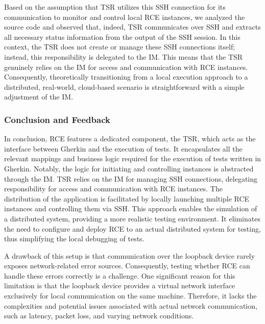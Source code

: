 Based on the assumption that \ac{TSR} utilizes this \ac{SSH} connection for its communication to monitor and control local \ac{RCE} instances, we analyzed the source code and observed that, indeed, \ac{TSR} communicates over \ac{SSH} and extracts all necessary status information from the output of the \ac{SSH} session. In this context, the \ac{TSR} does not create or manage these \ac{SSH} connections itself; instead, this responsibility is delegated to the \ac{IM}. This means that the \ac{TSR} genuinely relies on the \ac{IM} for access and communication with \ac{RCE} instances. Consequently, theoretically transitioning from a local execution approach to a distributed, real-world, cloud-based scenario is straightforward with a simple adjustment of the \ac{IM}.

\subsubsection{Conclusion and Feedback}
In conclusion, RCE features a dedicated component, the \acf{TSR}, which acts as the interface between Gherkin and the execution of tests. It encapsulates all the relevant mappings and business logic required for the execution of tests written in Gherkin. Notably, the logic for initiating and controlling instances is abstracted through the \acf{IM}. \ac{TSR} relies on the \ac{IM} for managing \ac{SSH} connections, delegating responsibility for access and communication with RCE instances. The distribution of the application is facilitated by locally launching multiple RCE instances and controlling them via \ac{SSH}. This approach enables the simulation of a distributed system, providing a more realistic testing environment. It eliminates the need to configure and deploy RCE to an actual distributed system for testing, thus simplifying the local debugging of tests.

A drawback of this setup is that communication over the loopback device rarely exposes network-related error sources. Consequently, testing whether RCE can handle these errors correctly is a challenge. One significant reason for this limitation is that the loopback device provides a virtual network interface exclusively for local communication on the same machine. Therefore, it lacks the complexities and potential issues associated with actual network communication, such as latency, packet loss, and varying network conditions.


